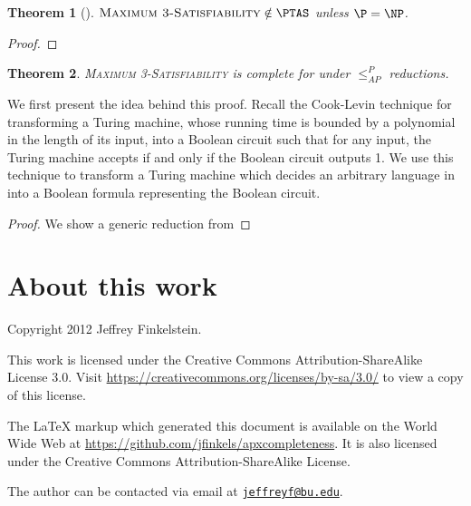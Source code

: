 \documentclass[]{article}
\theoremstyle{plain}
\newtheorem{theorem}{Theorem}
\newcommand{\APr}{\leq_{AP}^{P}}
\newcommand{\email}[1]{\href{mailto:#1}{\nolinkurl{#1}}}
\begin{document}
\begin{theorem}[{\cite[Theorem~6.3]{book}}]
  $\textsc{Maximum 3-Satisfiability} \notin \PTAS$ unless $\P=\NP$.
\end{theorem}
\begin{proof}
  
\end{proof}

\begin{theorem}
  \textsc{Maximum 3-Satisfiability} is complete for \APX{} under $\APr$ reductions.
\end{theorem}

We first present the idea behind this proof.
Recall the Cook-Levin technique for transforming a Turing machine, whose running time is bounded by a polynomial in the length of its input, into a Boolean circuit such that for any input, the Turing machine accepts if and only if the Boolean circuit outputs 1.
We use this technique to transform a Turing machine which decides an arbitrary language in \APX{} into a Boolean formula representing the Boolean circuit.

\begin{proof}
  We show a generic reduction from 
\end{proof}

\section*{About this work}

Copyright 2012 Jef{}frey Finkelstein.

This work is licensed under the Creative Commons Attribution-ShareAlike License 3.0.
Visit \mbox{\url{https://creativecommons.org/licenses/by-sa/3.0/}} to view a copy of this license.

The \LaTeX{} markup which generated this document is available on the World Wide Web at \mbox{\url{https://github.com/jfinkels/apxcompleteness}}.
It is also licensed under the Creative Commons Attribution-ShareAlike License.

The author can be contacted via email at \email{jeffreyf@bu.edu}.



\end{document}

